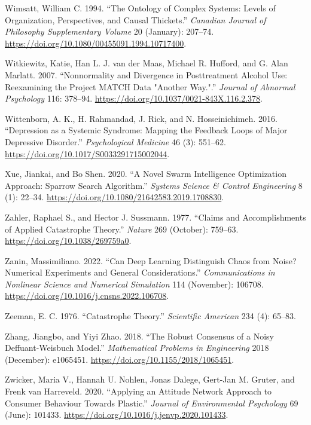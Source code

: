 \documentclass[
  a4paper,
  DIV=11,
  numbers=noendperiod,
  oneside]{scrreprt}
\newlength{\cslhangindent}
\newlength{\cslentryspacingunit} %
\newenvironment{CSLReferences}[2] %
 {%
  \setlength{\parindent}{0pt}
  \ifodd #1
  \let\oldpar\par
  \def\par{\hangindent=\cslhangindent\oldpar}
  \fi
  \setlength{\parskip}{#2\cslentryspacingunit}
 }%
 {}
\begin{document}
\begin{CSLReferences}{1}{0}
\leavevmode{}%
Wimsatt, William C. 1994. {``The Ontology of Complex Systems: Levels of
Organization, Perspectives, and Causal Thickets.''} \emph{Canadian
Journal of Philosophy Supplementary Volume} 20 (January): 207--74.
\url{https://doi.org/10.1080/00455091.1994.10717400}.

\leavevmode{}%
Witkiewitz, Katie, Han L. J. van der Maas, Michael R. Hufford, and G.
Alan Marlatt. 2007. {``Nonnormality and Divergence in Posttreatment
Alcohol Use: {Reexamining} the {Project MATCH} Data "Another Way.".''}
\emph{Journal of Abnormal Psychology} 116: 378--94.
\url{https://doi.org/10.1037/0021-843X.116.2.378}.

\leavevmode{}%
Wittenborn, A. K., H. Rahmandad, J. Rick, and N. Hosseinichimeh. 2016.
{``Depression as a Systemic Syndrome: Mapping the Feedback Loops of
Major Depressive Disorder.''} \emph{Psychological Medicine} 46 (3):
551--62. \url{https://doi.org/10.1017/S0033291715002044}.

\leavevmode{}%
Xue, Jiankai, and Bo Shen. 2020. {``A Novel Swarm Intelligence
Optimization Approach: Sparrow Search Algorithm.''} \emph{Systems
Science \& Control Engineering} 8 (1): 22--34.
\url{https://doi.org/10.1080/21642583.2019.1708830}.

\leavevmode{}%
Zahler, Raphael S., and Hector J. Sussmann. 1977. {``Claims and
Accomplishments of Applied Catastrophe Theory.''} \emph{Nature} 269
(October): 759--63. \url{https://doi.org/10.1038/269759a0}.

\leavevmode{}%
Zanin, Massimiliano. 2022. {``Can Deep Learning Distinguish Chaos from
Noise? Numerical Experiments and General Considerations.''}
\emph{Communications in Nonlinear Science and Numerical Simulation} 114
(November): 106708. \url{https://doi.org/10.1016/j.cnsns.2022.106708}.

\leavevmode{}%
Zeeman, E. C. 1976. {``Catastrophe {Theory}.''} \emph{Scientific
American} 234 (4): 65--83.

\leavevmode{}%
Zhang, Jiangbo, and Yiyi Zhao. 2018. {``The {Robust Consensus} of a
{Noisy Deffuant-Weisbuch Model}.''} \emph{Mathematical Problems in
Engineering} 2018 (December): e1065451.
\url{https://doi.org/10.1155/2018/1065451}.

\leavevmode{}%
Zwicker, Maria V., Hannah U. Nohlen, Jonas Dalege, Gert-Jan M. Gruter,
and Frenk van Harreveld. 2020. {``Applying an Attitude Network Approach
to Consumer Behaviour Towards Plastic.''} \emph{Journal of Environmental
Psychology} 69 (June): 101433.
\url{https://doi.org/10.1016/j.jenvp.2020.101433}.

\end{CSLReferences}



\printindex
\end{document}
